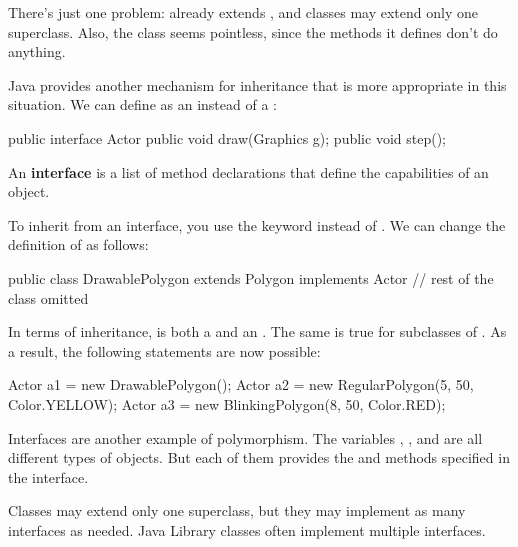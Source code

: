 There's just one problem:  already extends , and classes may extend only one superclass.
Also, the  class seems pointless, since the methods it defines don't do anything.


Java provides another mechanism for inheritance that is more appropriate in this situation.
We can define  as an  instead of a :

\begin{code}
public interface Actor {
    public void draw(Graphics g);
    public void step();
}
\end{code}


An {\bf interface} is a list of method declarations that define the capabilities of an object.



To inherit from an interface, you use the keyword  instead of .
We can change the definition of  as follows:

\begin{code}
public class DrawablePolygon extends Polygon implements Actor {
    // rest of the class omitted
}
\end{code}

In terms of inheritance,  is both a  and an .
The same is true for subclasses of .
As a result, the following statements are now possible:

\begin{code}
Actor a1 = new DrawablePolygon();
Actor a2 = new RegularPolygon(5, 50, Color.YELLOW);
Actor a3 = new BlinkingPolygon(8, 50, Color.RED);
\end{code}


Interfaces are another example of polymorphism.
The variables , , and  are all different types of objects.
But each of them provides the  and  methods specified in the  interface.

Classes may extend only one superclass, but they may implement as many interfaces as needed.
Java Library classes often implement multiple interfaces.


